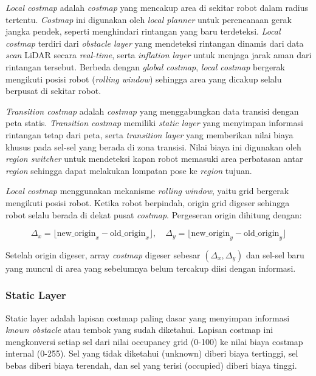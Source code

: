 \emph{Local costmap} adalah \emph{costmap} yang mencakup area di sekitar
robot dalam radius tertentu. \emph{Costmap} ini digunakan oleh
\emph{local planner} untuk perencanaan gerak jangka pendek, seperti
menghindari rintangan yang baru terdeteksi. \emph{Local costmap} terdiri
dari \emph{obstacle layer} yang mendeteksi rintangan dinamis dari data
\emph{scan} LiDAR secara \emph{real-time}, serta \emph{inflation layer}
untuk menjaga jarak aman dari rintangan tersebut. Berbeda dengan
\emph{global costmap}, \emph{local costmap} bergerak mengikuti posisi
robot (\emph{rolling window}) sehingga area yang dicakup selalu
berpusat di sekitar robot.

\emph{Transition costmap} adalah \emph{costmap} yang menggabungkan
data transisi dengan peta statis. \emph{Transition costmap} memiliki
\emph{static layer} yang menyimpan informasi rintangan tetap dari peta,
serta \emph{transition layer} yang memberikan nilai biaya khusus pada
sel-sel yang berada di zona transisi. Nilai biaya ini digunakan oleh
\emph{region switcher} untuk mendeteksi kapan robot memasuki area
perbatasan antar \emph{region} sehingga dapat melakukan lompatan pose
ke \emph{region} tujuan.

\emph{Local costmap} menggunakan mekanisme \emph{rolling window},
yaitu grid bergerak mengikuti posisi robot. Ketika robot berpindah,
origin grid digeser sehingga robot selalu berada di dekat pusat
\emph{costmap}. Pergeseran origin dihitung dengan:

\begin{equation}
\Delta_x = \lfloor \text{new\_origin}_x - \text{old\_origin}_x \rfloor, \quad
\Delta_y = \lfloor \text{new\_origin}_y - \text{old\_origin}_y \rfloor
\end{equation}

Setelah origin digeser, array \emph{costmap} digeser sebesar
$(\Delta_x, \Delta_y)$ dan sel-sel baru yang muncul di area yang
sebelumnya belum tercakup diisi dengan informasi.

\subsubsection{Static Layer}
Static layer adalah lapisan costmap paling dasar yang menyimpan informasi \emph{known obstacle} atau tembok yang sudah diketahui. Lapisan costmap ini mengkonversi setiap sel dari nilai occupancy grid (0-100) ke nilai biaya costmap internal (0-255). Sel yang tidak diketahui (unknown) diberi biaya tertinggi, sel bebas diberi biaya terendah, dan sel yang terisi (occupied) diberi biaya tinggi. 

